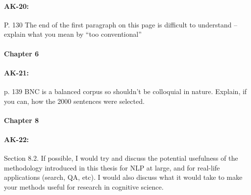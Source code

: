 \documentclass[11pt,a4paper]{article}
\begin{document}
\paragraph{AK-20:} P. 130 The end of the first paragraph on this page is difficult to understand – explain what you mean by “too conventional”

\paragraph{Chapter 6}

\paragraph{AK-21:} p. 139 BNC is a balanced corpus so shouldn’t be colloquial in nature. Explain, if you can, how the 2000 sentences were selected.

\paragraph{Chapter 8}

\paragraph{AK-22:} Section 8.2. If possible, I would try and discuss the potential usefulness of the methodology introduced in this thesis for NLP at large, and for real-life applications (search, QA, etc). I would also discuss what it would take to make your methods useful for research in cognitive science.
\end{document}
